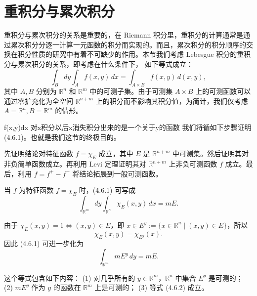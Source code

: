 \documentclass[lang=cn,10pt]{elegantbook}
\begin{document}
\section{重积分与累次积分}
重积分与累次积分的关系是重要的，在 Riemann 积分里，重积分的计算通常是通过累次积分分逐一计算一元函数的积分而实现的。而且，累次积分的积分顺序的交换在积分性质的研究中有着不可缺少的作用。本节我们考虑 Lebesgue 积分的重积分与累次积分的关系，即考虑在什么条件下， 如下等式成立：
\[
\int_B dy \int_A f(x,y)\,dx 
= \int_{A \times B} f(x,y)\,d(x,y),
\tag{4.6.1}
\]
其中 $A,B$ 分别为 $\mathbb{R}^n$ 和 $\mathbb{R}^m$ 中的可测子集。由于可测集 $A \times B$ 上的可测函数可以通过零扩充化为全空间 $\mathbb{R}^{n+m}$ 上的积分而不影响其积分值，为简计，我们仅考虑 $A = \mathbb{R}^n, B = \mathbb{R}^m$ 的情形。
\begin{dxtips}
    

f(x,y)dx 对x积分以后x消失积分出来的是一个关于y的函数
我们将循如下步骤证明 (4.6.1)。也就是我们这节的终极目的。
\end{dxtips}
先证明结论对特征函数 
$f = \chi_E$ 成立，其中 $E$ 是 $\mathbb{R}^{n+m}$ 中可测集。然后证明其对非负简单函数成立。再利用 Levi 定理证明其对 $\mathbb{R}^{n+m}$ 上非负可测函数 $f$ 成立。最后，利用 $f = f^+ - f^-$ 将结论拓展到一般可测函数。

当 $f$ 为特征函数 $f = \chi_E$ 时，(4.6.1) 可写成
\[
\int_{\mathbb{R}^m} dy \int_{\mathbb{R}^n} \chi_E(x,y) \, dx = mE.
\]

由于 $\chi_E(x,y) = 1 \iff (x,y) \in E$，即 $x \in E^y := \{x \in \mathbb{R}^n \mid (x,y)\in E\}$，所以
\[
\chi_E(x,y) = \chi_{E^y}(x).
\]
因此 (4.6.1) 可进一步化为
\[
\int_{\mathbb{R}^m} mE^y \, dy = mE. \tag{4.6.2}
\]

这个等式包含如下内容：  
(1) 对几乎所有的 $y \in \mathbb{R}^m$，$\mathbb{R}^n$ 中集合 $E^y$ 是可测的；  
(2) $mE^y$ 作为 $y$ 的函数在 $\mathbb{R}^m$ 上是可测的；  
(3) 等式 (4.6.2) 成立。  
\end{document}

